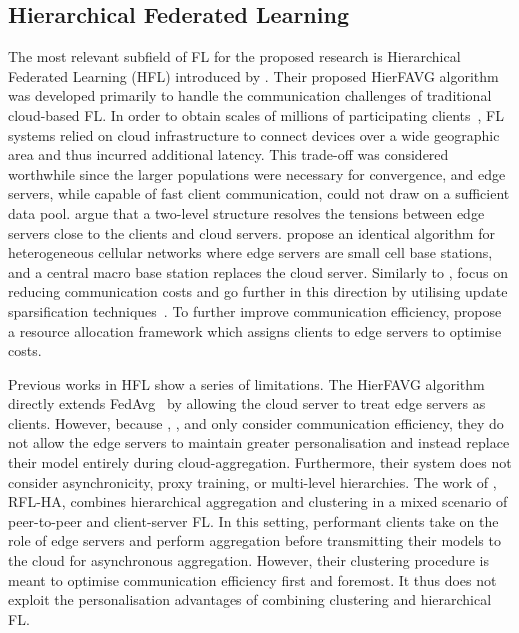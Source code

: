 \subsection{Hierarchical Federated Learning}\label{sec:back:HFL}
The most relevant subfield of FL for the proposed research is Hierarchical Federated Learning (HFL) introduced by \citet{Client-Edge-CloudHierFL}. Their proposed HierFAVG algorithm was developed primarily to handle the communication challenges of traditional cloud-based FL\@. In order to obtain scales of millions of participating clients~\citep{GoogleKeyboard, ScaleSystemDesign}, FL systems relied on cloud infrastructure to connect devices over a wide geographic area and thus incurred additional latency. This trade-off was considered worthwhile since the larger populations were necessary for convergence, and edge servers, while capable of fast client communication, could not draw on a sufficient data pool. \citet{Client-Edge-CloudHierFL} argue that a two-level structure resolves the tensions between edge servers close to the clients and cloud servers. \citet{Hier_Het_Cellular} propose an identical algorithm for heterogeneous cellular networks where edge servers are small cell base stations, and a central macro base station replaces the cloud server. Similarly to \citet{Client-Edge-CloudHierFL}, \citet{Hier_Het_Cellular} focus on reducing communication costs and go further in this direction by utilising update sparsification techniques~\citep{DeepGradientCompressin,CommCompressionDecent}. To further improve communication efficiency, \citet{HFELJointEdgeResource} propose a resource allocation framework which assigns clients to edge servers to optimise costs.

Previous works in HFL show a series of limitations. The HierFAVG algorithm directly extends FedAvg~\citep{FedAvg} by allowing the cloud server to treat edge servers as clients. However, because \citet{Client-Edge-CloudHierFL}, \citet{Hier_Het_Cellular}, and \citet{HFELJointEdgeResource} only consider communication efficiency, they do not allow the edge servers to maintain greater personalisation and instead replace their model entirely during cloud-aggregation. Furthermore, their system does not consider asynchronicity, proxy training, or multi-level hierarchies. The work of \citet{ResourceEfficientHierAgg}, RFL-HA, combines hierarchical aggregation and clustering in a mixed scenario of peer-to-peer and client-server FL. In this setting, performant clients take on the role of edge servers and perform aggregation before transmitting their models to the cloud for asynchronous aggregation. However, their clustering procedure is meant to optimise communication efficiency first and foremost. It thus does not exploit the personalisation advantages of combining clustering and hierarchical FL\@.

